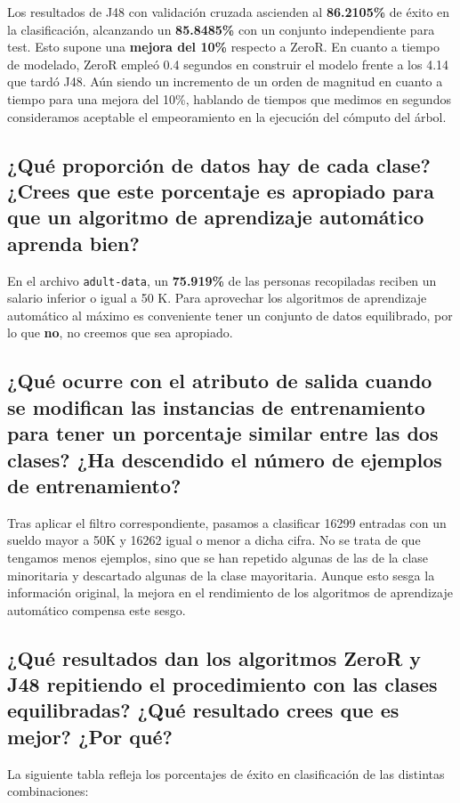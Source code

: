 \documentclass[12pt]{article}
\begin{document}
Los resultados de J48 con validación cruzada ascienden al \textbf{86.2105\%} de éxito en la clasificación, alcanzando un \textbf{85.8485\%} con un conjunto independiente para test. Esto supone una \textbf{mejora del 10\%} respecto a ZeroR. En cuanto a tiempo de modelado, ZeroR empleó 0.4 segundos en construir el modelo frente a los 4.14 que tardó J48. Aún siendo un incremento de un orden de magnitud en cuanto a tiempo para una mejora del 10\%, hablando de tiempos que medimos en segundos consideramos aceptable el empeoramiento en la ejecución del cómputo del árbol.

\subsection*{\small ¿Qué proporción de datos hay de cada clase? ¿Crees que este porcentaje es apropiado para que un algoritmo de aprendizaje automático aprenda bien?}

En el archivo \texttt{adult-data}, un \textbf{75.919\%} de las personas recopiladas reciben un salario inferior o igual a 50 K. Para aprovechar los algoritmos de aprendizaje automático al máximo es conveniente tener un conjunto de datos equilibrado, por lo que \textbf{no}, no creemos que sea apropiado.

\subsection*{\small ¿Qué ocurre con el atributo de salida cuando se modifican las instancias de entrenamiento para tener un porcentaje similar entre las dos clases? ¿Ha descendido el número de ejemplos de entrenamiento?}

Tras aplicar el filtro correspondiente, pasamos a clasificar 16299 entradas con un sueldo mayor a 50K y 16262 igual o menor a dicha cifra. No se trata de que tengamos menos ejemplos, sino que se han repetido algunas de las de la clase minoritaria y descartado algunas de la clase mayoritaria. Aunque esto sesga la información original, la mejora en el rendimiento de los algoritmos de aprendizaje automático compensa este sesgo.

\subsection*{\small ¿Qué resultados dan los algoritmos ZeroR y J48 repitiendo el procedimiento con las clases equilibradas? ¿Qué resultado crees que es mejor? ¿Por qué?}

La siguiente tabla refleja los porcentajes de éxito en clasificación de las distintas combinaciones:\\
\end{document}
